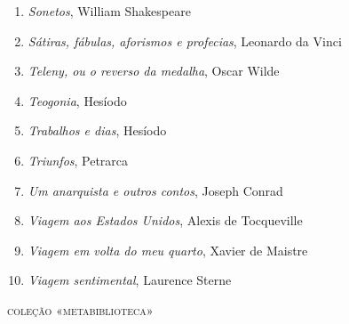 \begin{enumerate}
\item \textit{Sonetos}, William Shakespeare
\item \textit{Sátiras, fábulas, aforismos e profecias}, Leonardo da Vinci
\item \textit{Teleny, ou o reverso da medalha}, Oscar Wilde
\item \textit{Teogonia}, Hesíodo
\item \textit{Trabalhos e dias}, Hesíodo
\item \textit{Triunfos}, Petrarca
\item \textit{Um anarquista e outros contos}, Joseph Conrad
\item \textit{Viagem aos Estados Unidos}, Alexis de Tocqueville
\item \textit{Viagem em volta do meu quarto}, Xavier de Maistre 
\item \textit{Viagem sentimental}, Laurence Sterne
\end{enumerate}





\medskip
{\large\textsc{coleção «metabiblioteca»}}



